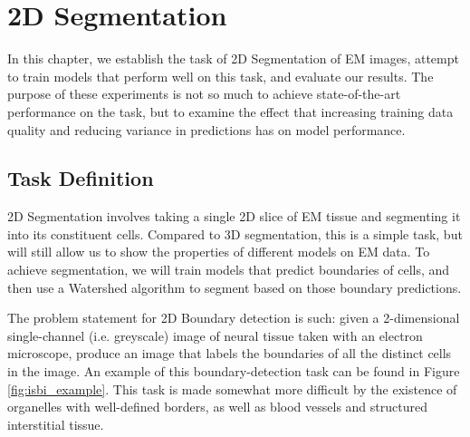\chapter{2D Segmentation}

In this chapter, we establish the task of 2D Segmentation of EM images, attempt to train models that perform well on this task, and evaluate our results. The purpose of these experiments is not so much to achieve state-of-the-art performance on the task, but to examine the effect that increasing training data quality and reducing variance in predictions has on model performance.

\section{Task Definition}

2D Segmentation involves taking a single 2D slice of EM tissue and segmenting it into its constituent cells. Compared to 3D segmentation, this is a simple task, but will still allow us to show the properties of different models on EM data. To achieve segmentation, we will train models that predict boundaries of cells, and then use a Watershed algorithm to segment based on those boundary predictions.

The problem statement for 2D Boundary detection is such: given a 2-dimensional single-channel (i.e. greyscale) image of neural tissue taken with an electron microscope, produce an image that labels the boundaries of all the distinct cells in the image. An example of this boundary-detection task can be found in Figure \ref{fig:isbi_example}. This task is made somewhat more difficult by the existence of organelles with well-defined borders, as well as blood vessels and structured interstitial tissue.

